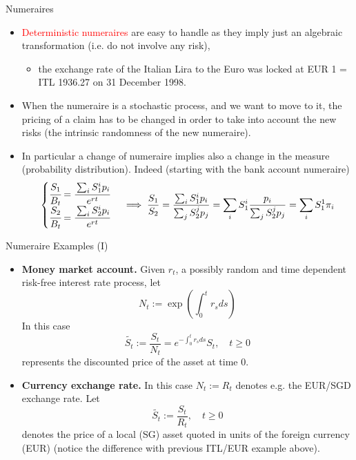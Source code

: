 \documentclass{beamer}
\begin{document}
\begin{frame}{Numeraires}
  \begin{itemize}
  \item<1-> \textcolor{red}{Deterministic numeraires} are easy to handle as they imply just an algebraic transformation (i.e. do not involve any risk),
    \begin{itemize}
    \item the exchange rate of the Italian Lira to the Euro was locked at EUR 1 = ITL 1936.27 on 31 December 1998.
    \end{itemize}
  \item<2-> When the numeraire is a stochastic process, and we want to move to it, the pricing of a claim has to be changed in order to take into account the new risks (the intrinsic randomness of the new numeraire).
  \item<3-> In particular a change of numeraire implies also a change in the measure (probability distribution). Indeed (starting with the bank account numeraire)
    \begin{equation*}
      \begin{cases}
        \cfrac{S_1}{B_t} = \cfrac{\sum_i S^i_1 p_i}{e^{rt}}\\
        \cfrac{S_2}{B_t} = \cfrac{\sum_i S^i_2 p_i}{e^{rt}}
      \end{cases}\implies
      \frac{S_1}{S_2} = \frac{\sum_i S^i_1 p_i}{\sum_j S^j_2 p_j} = \sum_i S_1^i \frac{p_i}{\sum_j S^j_2 p_j} = \sum_i S_1^1 \pi_i
    \end{equation*}
  \end{itemize}
\end{frame}

\begin{frame}{Numeraire Examples (I)}
  \begin{itemize}
  \item<1-> \textbf{Money market account.} Given $r_t$, a possibly random and time dependent risk-free interest rate process, let
    \begin{equation*}
      N_t := \exp\left(\int_0^t r_s ds\right)
    \end{equation*}
    In this case 
    \begin{equation*}
      \tilde{S_t}:=\frac{S_t}{N_t}=e^{-\int_0^t r_s ds}S_t, \quad t \ge 0
    \end{equation*}
    represents the discounted price of the asset at time 0.
  \item<2-> \textbf{Currency exchange rate.} In this case $N_t := R_t$ denotes e.g. the EUR/SGD exchange rate. Let
    \begin{equation*}
      \tilde{S_t}:=\frac{S_t}{R_t}, \quad t \ge 0
    \end{equation*}
    denotes the price of a local (SG) asset quoted in units of the foreign currency (EUR) (notice the difference with previous ITL/EUR example above).
  \end{itemize}
\end{frame}
\end{document}
